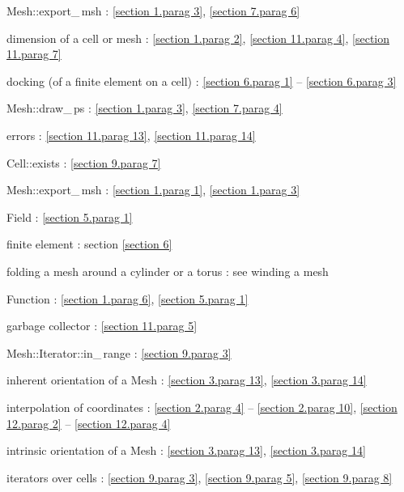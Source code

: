 \documentclass[a4paper]{scrreprt}
\def\numb{}
\newcommand\verm[1]{\textcolor{manif}{#1}}
\renewcommand\tt{\normalfont\ttfamily}
\begin{document}
\noindent
{\small\tt\verm{Mesh}::export\_\,msh} : \ref{\numb section 1.\numb parag 3},
\ref{\numb section 7.\numb parag 6}

\noindent
dimension of a cell or mesh : \ref{\numb section 1.\numb parag 2},
\ref{\numb section 11.\numb parag 4}, \ref{\numb section 11.\numb parag 7}

\noindent
docking (of a finite element on a cell) :
\ref{\numb section 6.\numb parag 1} -- \ref{\numb section 6.\numb parag 3}

\noindent
{\small\tt\verm{Mesh}::draw\_\,ps} : \ref{\numb section 1.\numb parag 3},
\ref{\numb section 7.\numb parag 4}

\noindent
errors : \ref{\numb section 11.\numb parag 13}, \ref{\numb section 11.\numb parag 14}

\noindent
{\small\tt\verm{Cell}::exists} : \ref{\numb section 9.\numb parag 7}

\noindent
{\small\tt\verm{Mesh}::export\_\,msh} : \ref{\numb section 1.\numb parag 1},
\ref{\numb section 1.\numb parag 3}

\noindent
{\small\tt \verm{Field}} : \ref{\numb section 5.\numb parag 1}

\noindent
finite element : section \ref{\numb section 6}

\noindent
folding a mesh around a cylinder or a torus : see winding a mesh

\noindent
{\small\tt \verm{Function}} : \ref{\numb section 1.\numb parag 6},
\ref{\numb section 5.\numb parag 1}

\noindent
garbage collector : \ref{\numb section 11.\numb parag 5}

\noindent
{\small\tt\verm{Mesh}::Iterator::in\_\,range} : \ref{\numb section 9.\numb parag 3}

\noindent
inherent orientation of a {\small\tt\verm{Mesh}} : \ref{\numb section 3.\numb parag 13},
\ref{\numb section 3.\numb parag 14}

\noindent
interpolation of coordinates :
\ref{\numb section 2.\numb parag 4} -- \ref{\numb section 2.\numb parag 10},
\ref{\numb section 12.\numb parag 2} -- \ref{\numb section 12.\numb parag 4}

\noindent
intrinsic orientation of a {\small\tt\verm{Mesh}} : \ref{\numb section 3.\numb parag 13},
\ref{\numb section 3.\numb parag 14}

\noindent
iterators over cells : \ref{\numb section 9.\numb parag 3}, \ref{\numb section 9.\numb parag 5},
\ref{\numb section 9.\numb parag 8}
\end{document}
